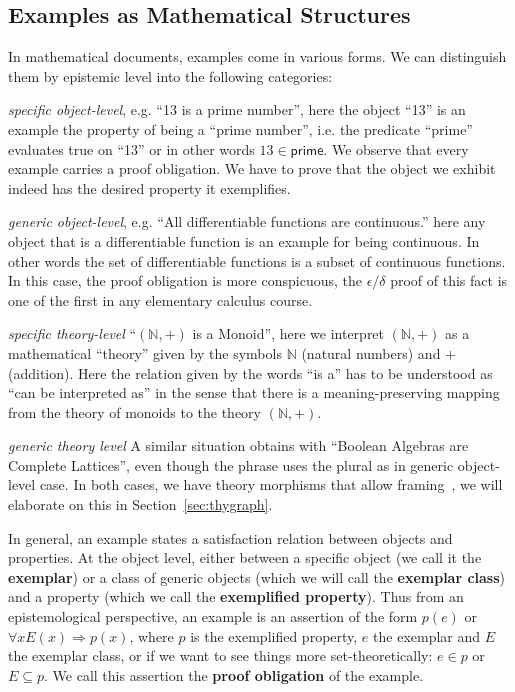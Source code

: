 \documentclass[11pt]{bluenote}
\def\cn#1{\mathsf{#1}}
\def\defemph{\textbf}
\begin{document}
\subsection{Examples as Mathematical Structures}
In mathematical documents, examples come in various forms. We can distinguish them by
epistemic level into the following categories: 
\begin{compactenum}
\item \emph{specific object-level}, e.g. ``13 is a prime number'', here the object ``13''
  is an example the property of being a ``prime number'', i.e. the predicate ``prime''
  evaluates true on ``13'' or in other words $13\in\cn{prime}$. We observe that every
  example carries a proof obligation. We have to prove that the object we exhibit indeed
  has the desired property it exemplifies.
\item \emph{generic object-level}, e.g. ``All differentiable functions are continuous.''
  here any object that is a differentiable function is an example for being continuous. In
  other words the set of differentiable functions is a subset of continuous functions. In
  this case, the proof obligation is more conspicuous, the $\epsilon/\delta$ proof of this
  fact is one of the first in any elementary calculus course.
\item \emph{specific theory-level} ``$(\mathbb{N},+)$ is a Monoid'', here we interpret
  $(\mathbb{N},+)$ as a mathematical ``theory'' given by the symbols $\mathbb{N}$ (natural
  numbers) and $+$ (addition). Here the relation given by the words ``is a'' has to be
  understood as ``can be interpreted as'' in the sense that there is a meaning-preserving
  mapping from the theory of monoids to the theory $(\mathbb{N},+)$.
\item \emph{generic theory level} A similar situation obtains with ``Boolean Algebras are
  Complete Lattices'', even though the phrase uses the plural as in generic object-level
  case.  In both cases, we have theory morphisms that allow
  framing~\cite{KohKoh:sifemp09}, we will elaborate on this in Section~\ref{sec:thygraph}.
\end{compactenum}
In general, an example states a satisfaction relation between objects and properties. At
the object level, either between a specific object (we call it the \defemph{exemplar}) or
a class of generic objects (which we will call the \defemph{exemplar class}) and a property (which we
call the \defemph{exemplified property}). Thus from an epistemological perspective, an
example is an assertion of the form $p(e)$ or $\forall{x} E(x)\Rightarrow p(x)$, where $p$
is the exemplified property, $e$ the exemplar and $E$ the exemplar class, or if we want to
see things more set-theoretically: $e\in p$ or $E\subseteq p$. We call this assertion the
\defemph{proof obligation} of the example.
\end{document}
